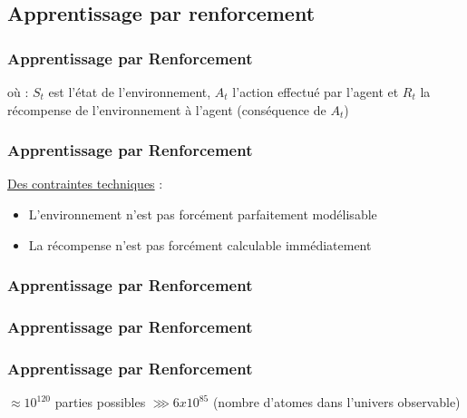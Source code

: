 \subsection{Apprentissage par renforcement}



\begin{frame}
  \frametitle{Apprentissage par Renforcement}
  où :
  \newline
  $S_t$ est l'état de l'environnement,
  \newline
  $A_t$ l'action effectué par l'agent et
  \newline
  $R_t$ la récompense de l'environnement à l'agent (conséquence de $A_t$)
\end{frame}

\begin{frame}
  \frametitle{Apprentissage par Renforcement}
  \underline{Des contraintes techniques} :
  \begin{itemize}
  \item L'environnement n'est pas forcément parfaitement modélisable
  \item La récompense n'est pas forcément calculable immédiatement
  \end{itemize}
\end{frame}

\begin{frame}
  \frametitle{Apprentissage par Renforcement}
\end{frame}

\begin{frame}
  \frametitle{Apprentissage par Renforcement}
  \begin{center}
  \end{center}
\end{frame}

\begin{frame}
  \frametitle{Apprentissage par Renforcement}
  \begin{center}
  \end{center}
  \begin{center}
    $\approx 10^{120}$ parties possibles $\ggg 6 x 10^{85}$
    \newline
    (nombre d'atomes dans l'univers observable)
  \end{center}
\end{frame}

